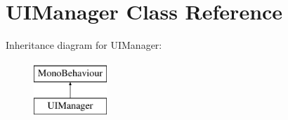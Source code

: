 \hypertarget{class_u_i_manager}{}\section{U\+I\+Manager Class Reference}
\label{class_u_i_manager}
Inheritance diagram for U\+I\+Manager\+:\begin{figure}[H]
\begin{center}
\leavevmode
\includegraphics[height=2.000000cm]{class_u_i_manager}
\end{center}
\end{figure}
